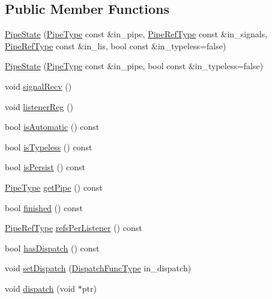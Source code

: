 \subsection*{Public Member Functions}
\begin{DoxyCompactItemize}
\item 
\hyperlink{structvt_1_1pipe_1_1_pipe_state_ae243864cd9ea61ddc564b6b3a0870eb4}{Pipe\+State} (\hyperlink{namespacevt_ac9852acda74d1896f48f406cd72c7bd3}{Pipe\+Type} const \&in\+\_\+pipe, \hyperlink{namespacevt_ace18d74dd489d9ea506d38789fffce34}{Pipe\+Ref\+Type} const \&in\+\_\+signals, \hyperlink{namespacevt_ace18d74dd489d9ea506d38789fffce34}{Pipe\+Ref\+Type} const \&in\+\_\+lis, bool const \&in\+\_\+typeless=false)
\item 
\hyperlink{structvt_1_1pipe_1_1_pipe_state_a2f6a2a7f657b0938d0214fc16b65969c}{Pipe\+State} (\hyperlink{namespacevt_ac9852acda74d1896f48f406cd72c7bd3}{Pipe\+Type} const \&in\+\_\+pipe, bool const \&in\+\_\+typeless=false)
\item 
void \hyperlink{structvt_1_1pipe_1_1_pipe_state_a3cd72e7d91b3752e2cb19bc42b7de397}{signal\+Recv} ()
\item 
void \hyperlink{structvt_1_1pipe_1_1_pipe_state_acfbe1dc3cac73153543a394b4f8add35}{listener\+Reg} ()
\item 
bool \hyperlink{structvt_1_1pipe_1_1_pipe_state_ada2a4221edc09264da146ff158e37d3c}{is\+Automatic} () const
\item 
bool \hyperlink{structvt_1_1pipe_1_1_pipe_state_a0e20b860728e1aded738be02074c5861}{is\+Typeless} () const
\item 
bool \hyperlink{structvt_1_1pipe_1_1_pipe_state_a8922ec696ab8a01651a53011a548b067}{is\+Persist} () const
\item 
\hyperlink{namespacevt_ac9852acda74d1896f48f406cd72c7bd3}{Pipe\+Type} \hyperlink{structvt_1_1pipe_1_1_pipe_state_ab69e2e4c5783a5df48087fdb436a7a2f}{get\+Pipe} () const
\item 
bool \hyperlink{structvt_1_1pipe_1_1_pipe_state_a593b2ce5b04ce3e4234654f454868434}{finished} () const
\item 
\hyperlink{namespacevt_ace18d74dd489d9ea506d38789fffce34}{Pipe\+Ref\+Type} \hyperlink{structvt_1_1pipe_1_1_pipe_state_ad7ec2850c900f8359affd00af6d7e0cc}{refs\+Per\+Listener} () const
\item 
bool \hyperlink{structvt_1_1pipe_1_1_pipe_state_adbd64a53d60cfe18a7c9994cf2af901b}{has\+Dispatch} () const
\item 
void \hyperlink{structvt_1_1pipe_1_1_pipe_state_a436083ce72366f0bece034065bb3aca1}{set\+Dispatch} (\hyperlink{structvt_1_1pipe_1_1_pipe_state_ad81b637847d9c3185420c58c9272ed7d}{Dispatch\+Func\+Type} in\+\_\+dispatch)
\item 
void \hyperlink{structvt_1_1pipe_1_1_pipe_state_a1e2aea22713ea6b745323f6b3f82b6ed}{dispatch} (void $\ast$ptr)
\end{DoxyCompactItemize}

